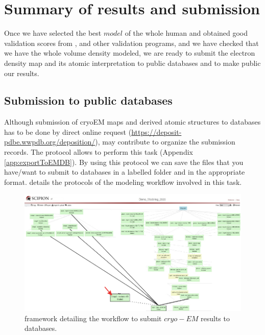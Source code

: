 \section{Summary of results and submission}

Once we have selected the best $model$ of the whole human  and obtained good validation scores from \emringer, \molprobity and other validation programs, and we have checked that we have the whole volume density modeled, we are ready to submit the electron density map and its atomic interpretation to public databases and to make public our results.\\

\subsection*{Submission to public databases}

Although submission of cryoEM maps and derived atomic structures to databases has to be done by direct online request (\url{https://deposit-pdbe.wwpdb.org/deposition/}), \scipion may contribute to organize the submission records. The protocol  allows to perform this task (Appendix \ref{app:exportToEMDB}). By using this protocol we can save the files that you have/want to submit to databases in a labelled folder and in the appropriate format.  details the protocols of the modeling \scipion workflow involved in this task.

 \begin{figure}[H]
  \centering 
  \captionsetup{width=.9\linewidth} 
  \includegraphics[width=1\textwidth]{Images/Fig78}
  \caption{\scipion framework detailing the workflow to submit $cryo-EM$ results to databases.}
  \label{fig:scipion_workflow_submission}
  \end{figure}

